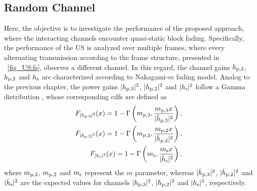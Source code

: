



\subsection{Random Channel}\label{ssec_US:ltpa}
Here, the objective is to investigate the performance of the proposed approach, where the interacting channels encounter quasi-static block fading. Specifically, the performance of the US is analyzed over multiple frames, where every alternating transmission according to the frame structure, presented in \figurename~\ref{fig_US:fs}, observes a different channel. In this regard, the channel gains $h_{\text{p,3}}$, $h_{\text{p,2}}$ and $h_{\text{s}}$ are characterized according to Nakagami-$m$ fading model. Analog to the previous chapter, the power gains $|h_{\text{p,3}}|^2$, $|h_{\text{p,2}}|^2$ and $|h_{\text{s}}|^2$ follow a Gamma distribution \cite{Goldsmith05}, whose corresponding cdfs are defined as  
\begin{align}
F_{|h_{\text{p,3}}|^2}(x) = 1 - \Gamma\left(m_{\text{p,3}}, \frac{m_{\text{p,3}} x}{|\bar{h}_{\text{p,3}}|^2}\right), \label{eq_US:dis_pgpth}\\
F_{|h_{\text{p,2}}|^2}(x) = 1 - \Gamma\left(m_{\text{p,2}}, \frac{m_{\text{p,2}} x}{|\bar{h}_{\text{p,2}}|^2}\right), \label{eq_US:dis_pgpt}\\  
F_{|h_{\text{s}}|^2}(x) = 1 - \Gamma\left(m_{\text{s}} , \frac{m_{\text{s}} x}{|\bar{h}_{\text{s}}|^2}\right), \label{eq_US:dis_pgs}
\end{align}
where $m_{\text{p,3}}$, $m_{\text{p,2}}$ and $m_{\text{s}}$ represent the $m$ parameter, whereas $|\bar{h}_{\text{p,3}}|^2$, $|\bar{h}_{\text{p,2}}|^2$ and $|\bar{h}_{\text{s}}|^2$ are the expected values for channels $|h_{\text{p,3}}|^2$, $|h_{\text{p,2}}|^2$ and $|h_{\text{s}}|^2$, respectively. %
